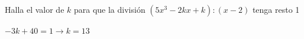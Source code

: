 \documentclass[addpoints,spanish, 12pt,a4paper]{exam}
\begin{document}
\begin{questions}

\addpoints

\question[1] Halla el valor de $k$ para que la división $\left( 5x^3-2kx+k \right): \left(x - 2\right)$  tenga resto 1
\begin{solution} $- 3 k + 40=1 \to k = 13 $ \end{solution}


\end{questions}
\end{document}
